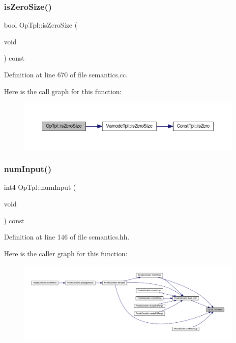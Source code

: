 \subsubsection{\texorpdfstring{isZeroSize()}{isZeroSize()}}
{\footnotesize\ttfamily bool Op\+Tpl\+::is\+Zero\+Size (\begin{DoxyParamCaption}\item[{void}]{ }\end{DoxyParamCaption}) const}



Definition at line 670 of file semantics.\+cc.

Here is the call graph for this function\+:
\nopagebreak
\begin{figure}[H]
\begin{center}
\leavevmode
\includegraphics[width=350pt]{class_op_tpl_a4eef0c979a1d23e5e761102ad6530fb6_cgraph}
\end{center}
\end{figure}
\mbox{\label{class_op_tpl_ae80f4c316de0e768c704b120d46c05a6}} 
\subsubsection{\texorpdfstring{numInput()}{numInput()}}
{\footnotesize\ttfamily int4 Op\+Tpl\+::num\+Input (\begin{DoxyParamCaption}\item[{void}]{ }\end{DoxyParamCaption}) const\hspace{0.3cm}{\ttfamily [inline]}}



Definition at line 146 of file semantics.\+hh.

Here is the caller graph for this function\+:
\nopagebreak
\begin{figure}[H]
\begin{center}
\leavevmode
\includegraphics[width=350pt]{class_op_tpl_ae80f4c316de0e768c704b120d46c05a6_icgraph}
\end{center}
\end{figure}
\mbox{\label{class_op_tpl_aeb61240e9ee070a3f8f87cd15a39aee6}} 
